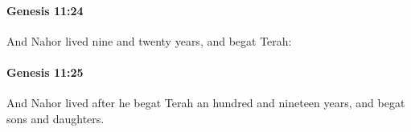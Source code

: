 		\paragraph{Genesis 11:24} %
			\label{GENESIS-11-24}

			And Nahor lived nine and twenty years, and begat Terah:


		\paragraph{Genesis 11:25} %
			\label{GENESIS-11-25}

			And Nahor lived after he begat Terah an hundred and nineteen years, and begat sons and daughters.


